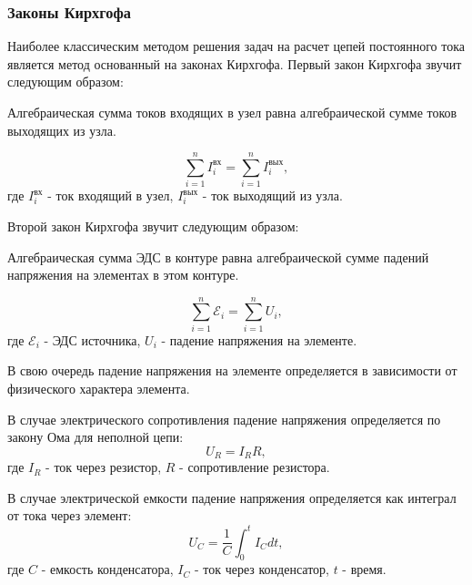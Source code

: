 \subsubsection{Законы Кирхгофа}
Наиболее классическим методом решения задач на расчет цепей постоянного тока является метод основанный на законах Кирхгофа.
Первый закон Кирхгофа звучит следующим образом:

\begin{tcolorbox}[
    colback=blue!5!white,
    colframe=black!50!black,
    title=Первый закон Кирхгофа,
    fonttitle=\bfseries,
    arc=3pt,
    boxrule=1pt
]
Алгебраическая сумма токов входящих в узел равна алгебраической сумме токов выходящих из узла.
\end{tcolorbox}
\begin{equation}
    \sum_{i=1}^{n} I_i^{\text{вх}} = \sum_{i=1}^{n} I_i^{\text{вых}},
    \label{eq:kirchhoff_laws_1}
\end{equation}
где $I_i^{\text{вх}}$ - ток входящий в узел, $I_i^{\text{вых}}$ - ток выходящий из узла.

Второй закон Кирхгофа звучит следующим образом:

\begin{tcolorbox}[
    colback=blue!5!white,
    colframe=black!50!black,
    title=Второй закон Кирхгофа,
    fonttitle=\bfseries,
    arc=3pt,
    boxrule=1pt
]
Алгебраическая сумма ЭДС в контуре равна алгебраической сумме падений напряжения на элементах в этом контуре.
\end{tcolorbox}

\begin{equation}
    \sum_{i=1}^{n} \mathcal{E}_i = \sum_{i=1}^{n} U_i,
    \label{eq:kirchhoff_laws_2}
\end{equation}
где $\mathcal{E}_i$ - ЭДС источника, $U_i$ - падение напряжения на элементе.

В свою очередь падение напряжения на элементе определяется в зависимости от физического характера элемента.

В случае электрического сопротивления падение напряжения определяется по закону Ома для неполной цепи:
\begin{equation}
    U_R = I_R R,
    \label{eq:kirchhoff_laws_2_1}
\end{equation}
где $I_R$ - ток через резистор, $R$ - сопротивление резистора.

В случае электрической емкости падение напряжения определяется как интеграл от тока через элемент:
\begin{equation}
    U_C = \frac{1}{C} \int_{0}^{t} I_C dt,
    \label{eq:kirchhoff_laws_2_2}
\end{equation}
где $C$ - емкость конденсатора, $I_C$ - ток через конденсатор, $t$ - время.

